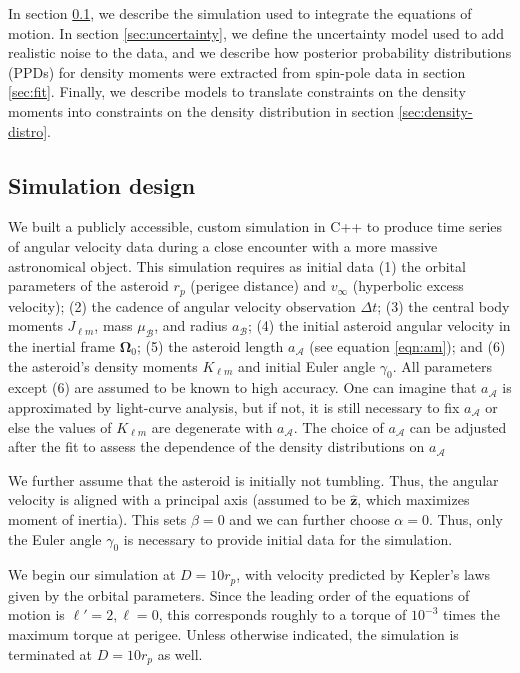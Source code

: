 \documentclass[fleqn,usenatbib]{mnras}
\newcommand{\unit}[1]{\bm{\hat{#1}}}
\begin{document}
In section \ref{sec:sim}, we describe the simulation used to integrate the equations of motion. In section \ref{sec:uncertainty}, we define the uncertainty model used to add realistic noise to the data, and we describe how posterior probability distributions (PPDs) for density moments were extracted from spin-pole data in section \ref{sec:fit}. Finally, we describe models to translate constraints on the density moments into constraints on the density distribution in section \ref{sec:density-distro}.


\subsection{Simulation design}
\label{sec:sim}

We built a publicly accessible, custom simulation in C++ to produce time series of angular velocity data during a close encounter with a more massive astronomical object. This simulation requires as initial data (1) the orbital parameters of the asteroid $r_p$ (perigee distance) and $v_\infty$ (hyperbolic excess velocity); (2) the cadence of angular velocity observation $\Delta t$; (3) the central body moments $J_{\ell m}$, mass $\mu_\mathcal{B}$, and radius $a_\mathcal{B}$; (4) the initial asteroid angular velocity in the inertial frame $\bm \Omega_0$; (5) the asteroid length $a_\mathcal{A}$ (see equation \ref{eqn:am}); and (6) the asteroid's density moments $K_{\ell m}$ and initial Euler angle $\gamma_0$. All parameters except (6) are assumed to be known to high accuracy. One can imagine that $a_\mathcal{A}$ is approximated by light-curve analysis, but if not, it is still necessary to fix $a_\mathcal{A}$ or else the values of $K_{\ell m}$ are degenerate with $a_\mathcal{A}$. The choice of $a_\mathcal{A}$ can be adjusted after the fit to assess the dependence of the density distributions on $a_\mathcal{A}$

We further assume that the asteroid is initially not tumbling. Thus, the angular velocity is aligned with a principal axis (assumed to be $\unit z$, which maximizes moment of inertia). This sets $\beta = 0$ and we can further choose $\alpha = 0$. Thus, only the Euler angle $\gamma_0$ is necessary to provide initial data for the simulation.

We begin our simulation at $D = 10 r_p$, with velocity predicted by Kepler's laws given by the orbital parameters. Since the leading order of the equations of motion is $\ell' = 2, \ell = 0$, this corresponds roughly to a torque of $10^{-3}$ times the maximum torque at perigee. Unless otherwise indicated, the simulation is terminated at $D=10 r_p$ as well.
\end{document}
